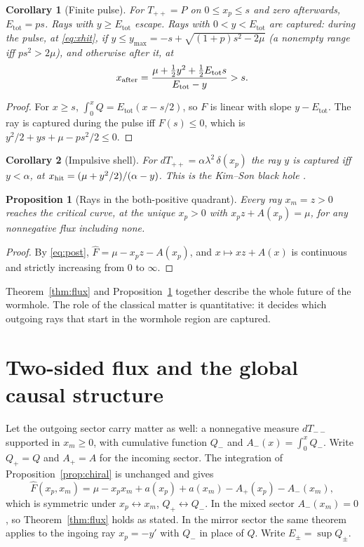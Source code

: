 \documentclass[11pt]{article}
\newtheorem{proposition}{Proposition}
\newtheorem{corollary}{Corollary}
\theoremstyle{remark}
\newcommand{\Etot}{E_{\mathrm{tot}}}
\newcommand{\Fh}{\widehat F}
\begin{document}
\begin{corollary}[Finite pulse]\label{cor:pulse}
For $T_{++}=P$ on $0\le x_p\le s$ and zero afterwards, $\Etot=ps$. Rays with $y\ge\Etot$ escape. Rays with $0<y<\Etot$ are captured: during the pulse, at \eqref{eq:xhit}, if $y\le y_{\max}=-s+\sqrt{(1+p)s^2-2\mu}$ (a nonempty range iff $ps^2>2\mu$), and otherwise after it, at
\[
x_{\rm after}=\frac{\mu+\tfrac12y^2+\tfrac12\Etot s}{\Etot-y}>s .
\]
\end{corollary}
\begin{proof}
For $x\ge s$, $\int_0^xQ=\Etot(x-s/2)$, so $F$ is linear with slope $y-\Etot$. The ray is captured during the pulse iff $F(s)\le0$, which is $y^2/2+ys+\mu-ps^2/2\le0$.
\end{proof}

\begin{corollary}[Impulsive shell]\label{cor:impulse}
For $dT_{++}=\alpha\lambda^2\,\delta(x_p)$ the ray $y$ is captured iff $y<\alpha$, at $x_{\rm hit}=(\mu+y^2/2)/(\alpha-y)$. This is the Kim--Son black hole \cite{KimSon}.
\end{corollary}

\begin{proposition}[Rays in the both-positive quadrant]\label{prop:post}
Every ray $x_m=z>0$ reaches the critical curve, at the unique $x_p>0$ with $x_pz+A(x_p)=\mu$, for any nonnegative flux including none.
\end{proposition}
\begin{proof}
By \eqref{eq:post}, $\Fh=\mu-x_pz-A(x_p)$, and $x\mapsto xz+A(x)$ is continuous and strictly increasing from $0$ to $\infty$.
\end{proof}

Theorem~\ref{thm:flux} and Proposition~\ref{prop:post} together describe the whole future of the wormhole. The role of the classical matter is quantitative: it decides which outgoing rays that start in the wormhole region are captured.

\section{Two-sided flux and the global causal structure}\label{sec:global}

Let the outgoing sector carry matter as well: a nonnegative measure $dT_{--}$ supported in $x_m\ge0$, with cumulative function $Q_-$ and $A_-(x)=\int_0^xQ_-$. Write $Q_+=Q$ and $A_+=A$ for the incoming sector. The integration of Proposition~\ref{prop:chiral} is unchanged and gives
\begin{equation}\label{eq:two}
\Fh(x_p,x_m)=\mu-x_px_m+a(x_p)+a(x_m)-A_+(x_p)-A_-(x_m),
\end{equation}
which is symmetric under $x_p\leftrightarrow x_m$, $Q_+\leftrightarrow Q_-$. In the mixed sector $A_-(x_m)=0$, so Theorem~\ref{thm:flux} holds as stated. In the mirror sector the same theorem applies to the ingoing ray $x_p=-y'$ with $Q_-$ in place of $Q$. Write $E_\pm=\sup Q_\pm$.
\end{document}
